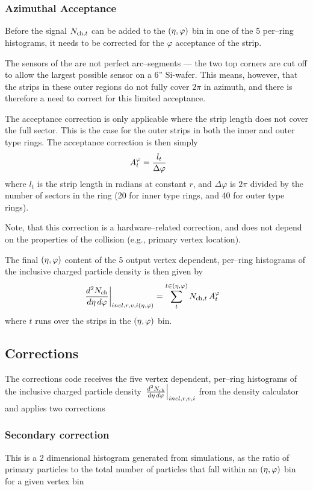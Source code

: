 \documentclass[11pt]{article}
\def\AlwaysText#1{\ifmmode\relax\text{#1}\else #1\fi}
\newcommand{\AbbrName}[1]{\AlwaysText{{\scshape #1}}}
\newcommand{\FMD}[1][]{\AbbrName{fmd\ifx|#1|\else#1\fi}}
\newcommand{\mult}[1][]{\ensuremath N_{\text{ch}#1}}
\newcommand{\dndetadphi}[1][]{{\ensuremath%
    \ifx|#1|\else\left.\fi%
    \frac{d^2\mult{}}{d\eta\,d\varphi}%
    \ifx|#1|\else\right|_{#1}\fi%
}}
\newcommand{\etaphi}{\ensuremath(\eta,\varphi)}
\newcommand{\Corners}{\ensuremath A^{\varphi}_{t}}
\begin{document}
\subsubsection{Azimuthal Acceptance}

Before the signal $\mult[,t]$ can be added to the $\etaphi$
bin in one of the 5 per--ring histograms, it needs to be corrected for
the $\varphi$ acceptance of the strip.

The sensors of the \FMD{} are not perfect arc--segments --- the two
top corners are cut off to allow the largest possible sensor on a 6''
Si-wafer.   This means, however, that the strips in these outer
regions do not fully cover $2\pi$ in azimuth, and there is therefore a
need to correct for this limited acceptance.  

The acceptance correction is only applicable where the strip length
does not cover the full sector.  This is the case for the outer strips
in both the inner and outer type rings.  The acceptance correction is
then simply 
\begin{align}
  \label{eq:acc_corr}
  \Corners{} &= \frac{l_t}{\Delta\varphi}\quad
\end{align}
where $l_t$ is the strip length in radians at constant $r$, and
$\Delta\varphi$ is $2\pi$ divided by the number of sectors in the
ring (20 for inner type rings, and 40 for outer type rings). 

Note, that this correction is a hardware--related correction, and does
not depend on the properties of the collision (e.g., primary vertex
location). 

The final $\etaphi$ content of the 5 output vertex dependent,
per--ring histograms of the inclusive charged particle density is then
given by
\begin{align}
  \label{eq:density}
  \dndetadphi[incl,r,v,i\etaphi] &= \sum_t^{t\in\etaphi}
  \mult[,t]\,\Corners{}
\end{align}
where $t$ runs over the strips in the $\etaphi$ bin. 

\subsection{Corrections}
\label{sec:sub:corrector}

The corrections code receives the five vertex dependent,
per--ring histograms of the inclusive charged particle density
$\dndetadphi[incl,r,v,i]$ from the density calculator and applies
two corrections 

\subsubsection{Secondary correction}
This is a 2 dimensional histogram generated from simulations, as the
ratio of primary particles to the total number of particles that fall
within an $\etaphi$ bin for a given vertex bin
\end{document}
